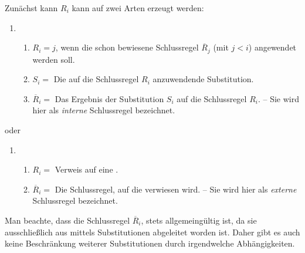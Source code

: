 \begin{enumerate}
	Zunächst kann $R_i$ kann auf zwei Arten erzeugt werden:
	\begin{enumerate}
		\item
		\begin{enumerate}
			\item $R_i = j$, wenn die schon bewiesene Schlussregel $\overline{R}_j$ (mit $j < i$) angewendet werden soll.
			\item $S_i =$ Die auf die Schlussregel $R_i$ anzuwendende Substitution.
			\item $\overline{R}_i =$ Das Ergebnis der Substitution $S_i$ auf die Schlussregel $R_i$.
			-- Sie wird hier als \emph{interne} Schlussregel bezeichnet.
		\end{enumerate}
		\setcounter{Enumii}{\value{enumii}}%
	\end{enumerate}
	oder
	\begin{enumerate}
		\setcounter{enumii}{\value{Enumii}}%
		\item
		\begin{enumerate}
			\item $R_i =$ Verweis auf eine .
			\item $\overline{R}_i =$ Die Schlussregel, auf die verwiesen wird.
			-- Sie wird hier als \emph{externe} Schlussregel bezeichnet.
		\end{enumerate}
		\setcounter{Enumii}{\value{enumii}}%
	\end{enumerate}
	Man beachte, dass die Schlussregel $\overline{R}_i$, stets allgemeingültig ist, da sie ausschließlich aus  mittels Substitutionen abgeleitet worden ist.
	Daher gibt es auch keine Beschränkung weiterer Substitutionen durch irgendwelche Abhängigkeiten.


\end{enumerate}
